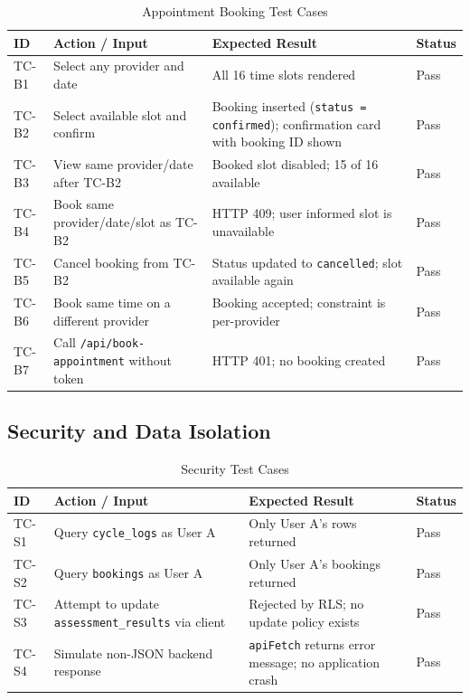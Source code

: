 \begin{table}[h!]
\centering
\caption{Appointment Booking Test Cases}
\label{tab:tc-booking}
\renewcommand{\arraystretch}{1.3}
\setlength{\tabcolsep}{5pt}
\begin{tabular}{|p{1cm}|p{4.5cm}|p{5cm}|p{1.5cm}|}
\hline
\rowcolor[HTML]{D9D9D9}
\textbf{ID} & \textbf{Action / Input} & \textbf{Expected Result} & \textbf{Status} \\
\hline
TC-B1 & Select any provider and date & All 16 time slots rendered & Pass \\
\hline
TC-B2 & Select available slot and confirm & Booking inserted (\texttt{status = confirmed}); confirmation card with booking ID shown & Pass \\
\hline
TC-B3 & View same provider/date after TC-B2 & Booked slot disabled; 15 of 16 available & Pass \\
\hline
TC-B4 & Book same provider/date/slot as TC-B2 & HTTP 409; user informed slot is unavailable & Pass \\
\hline
TC-B5 & Cancel booking from TC-B2 & Status updated to \texttt{cancelled}; slot available again & Pass \\
\hline
TC-B6 & Book same time on a different provider & Booking accepted; constraint is per-provider & Pass \\
\hline
TC-B7 & Call \texttt{/api/book-appointment} without token & HTTP 401; no booking created & Pass \\
\hline
\end{tabular}
\end{table}

\subsection{Security and Data Isolation}
\label{subsec:tc-security}

\begin{table}[h!]
\centering
\caption{Security Test Cases}
\label{tab:tc-security}
\renewcommand{\arraystretch}{1.3}
\setlength{\tabcolsep}{5pt}
\begin{tabular}{|p{1cm}|p{4.5cm}|p{5cm}|p{1.5cm}|}
\hline
\rowcolor[HTML]{D9D9D9}
\textbf{ID} & \textbf{Action / Input} & \textbf{Expected Result} & \textbf{Status} \\
\hline
TC-S1 & Query \texttt{cycle\_logs} as User A & Only User A's rows returned & Pass \\
\hline
TC-S2 & Query \texttt{bookings} as User A & Only User A's bookings returned & Pass \\
\hline
TC-S3 & Attempt to update \texttt{assessment\_results} via client & Rejected by RLS; no update policy exists & Pass \\
\hline
TC-S4 & Simulate non-JSON backend response & \texttt{apiFetch} returns error message; no application crash & Pass \\
\hline
\end{tabular}
\end{table}

